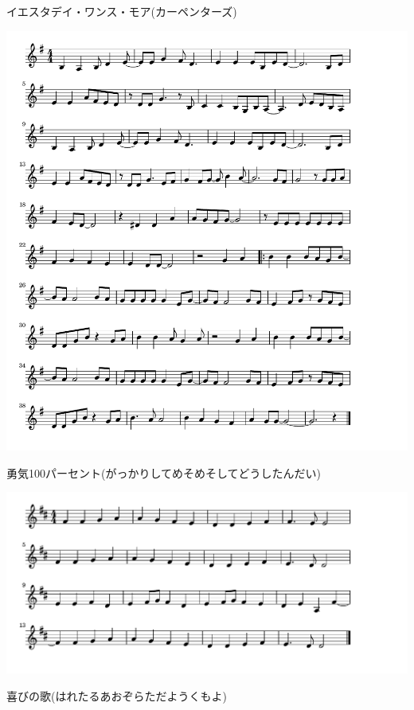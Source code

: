 \documentclass[a4paper]{ltjsarticle}
\begin{document}
\vspace{-10mm}

\parindent=50pt 
イエスタデイ・ワンス・モア(カーペンターズ)
\parindent=10pt

\vspace{10mm}


\includegraphics[clip]{yuki100p_crop.pdf}

\vspace{-10mm}

\parindent=50pt 
勇気100パーセント(がっかりしてめそめそしてどうしたんだい)
\parindent=10pt

\vspace{10mm}


\includegraphics[clip]{yorokobi_crop.pdf}

\vspace{-10mm}

\parindent=50pt 
喜びの歌(はれたるあおぞらただようくもよ)
\parindent=10pt

\vspace{10mm}
\end{document}
